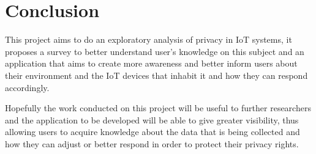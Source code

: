 \documentclass[conference]{IEEEtran}
\begin{document}
\section{Conclusion}

This project aims to do an exploratory analysis of privacy in IoT systems,
it proposes a survey to better understand user's knowledge on this subject
and an application that aims to create more awareness and better inform
users about their environment and the IoT devices that inhabit it and how
they can respond accordingly.

Hopefully the work conducted on this project will be useful to further
researchers and the application to be developed will be able to
give greater visibility, thus allowing users to acquire knowledge about the
data that is being collected and how they can adjust or better respond
in order to protect their privacy rights.






\end{document}
